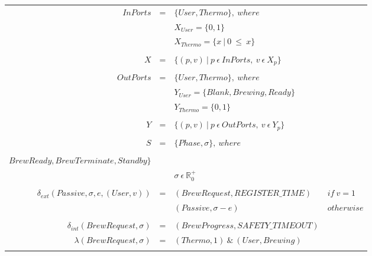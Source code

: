 \documentclass[10pt]{article}
\begin{document}
\begin{footnotesize}
\begin{center}
  \begin{tabular}{r c p{6.5cm} l}
    $InPorts$ & = & $\{User,Thermo\},~where$ \\
    & & $X_{User}=\{0,1\}$ \\
    & & $X_{Thermo}=\{x~|~0~\leq~x\}$ \\
    \\
    $X$ & = & $\{(p,v)~|~p~\epsilon~InPorts,~v~\epsilon~X_p\}$ \\
    \\
    $OutPorts$ & = & $\{User,Thermo\},~where$ \\
    & & $Y_{User}=\{Blank,Brewing,Ready\}$ \\
    & & $Y_{Thermo}=\{0,1\}$ \\
    \\
    $Y$ & = & $\{(p,v)~|~p~\epsilon~OutPorts,~v~\epsilon~Y_p\}$ \\
    \\
    $S$ & = & $\{Phase,\sigma\},~where$ \\
    & & \makecell[vl]{$Phase~\epsilon~\{Passive,BrewRequest,BrewProgress,$\\\hspace{1.5cm}$BrewReady,BrewTerminate,Standby\}$} \\
    & & $\sigma~\epsilon~\mathbb{R}_{0}^{+}$ \\
    \\

    $\delta_{ext}(Passive,\sigma,e,(User,v))$ & = & $(BrewRequest,REGISTER\_TIME)$ & $if~v=1$ \\
    & & $(Passive,\sigma-e)$ & $otherwise$ \\
    \\

    $\delta_{int}(BrewRequest,\sigma)$ & = & $(BrewProgress,SAFETY\_TIMEOUT)$ \\
    $\lambda(BrewRequest,\sigma)$ & = & $(Thermo,1)~\&~(User,Brewing)$ \\
    \\


\end{tabular}
\end{center}
\end{footnotesize}
\end{document}
